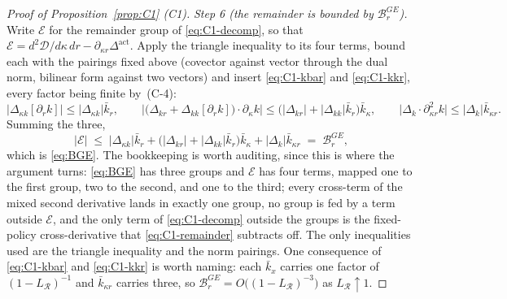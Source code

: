\documentclass[11pt]{article}
\newcommand{\Dact}{\Delta^{\mathrm{act}}}
\begin{document}
\begin{proof}[Proof of Proposition~\ref{prop:C1} (C1)]
\emph{Step 6 (the remainder is bounded by $\mathcal B_r^{GE}$).} Write $\mathcal E$ for the
remainder group of \eqref{eq:C1-decomp}, so that
$\mathcal E = d^2\mathcal D/d\kappa\,dr - \partial_{\kappa r}\Dact$. Apply the triangle inequality
to its four terms, bound each with the pairings fixed above (covector against vector through the
dual norm, bilinear form against two vectors) and insert \eqref{eq:C1-kbar} and
\eqref{eq:C1-kkr}, every factor being finite by~(C-4):
\[
\bigl\lvert\Delta_{\kappa k}[\partial_r k]\bigr\rvert \le \lvert\Delta_{\kappa k}\rvert\bar k_r,
\qquad
\bigl\lvert\bigl(\Delta_{kr}+\Delta_{kk}[\partial_r k]\bigr)\cdot\partial_\kappa k\bigr\rvert
\le \bigl(\lvert\Delta_{kr}\rvert + \lvert\Delta_{kk}\rvert\bar k_r\bigr)\bar k_\kappa,
\qquad
\bigl\lvert\Delta_k\cdot\partial^2_{\kappa r}k\bigr\rvert \le \lvert\Delta_k\rvert\bar k_{\kappa r}.
\]
Summing the three,
\begin{equation}
\label{eq:C1-remainder}
\bigl\lvert \mathcal E \bigr\rvert
\;\le\; \lvert\Delta_{\kappa k}\rvert\bar k_r
+ \bigl(\lvert\Delta_{kr}\rvert + \lvert\Delta_{kk}\rvert\bar k_r\bigr)\bar k_\kappa
+ \lvert\Delta_k\rvert\bar k_{\kappa r}
\;=\; \mathcal B_r^{GE},
\end{equation}
which is \eqref{eq:BGE}. The bookkeeping is worth auditing, since this is where the argument turns:
\eqref{eq:BGE} has three groups and $\mathcal E$ has four terms, mapped one to the first group, two
to the second, and one to the third; every cross-term of the mixed second derivative lands in
exactly one group, no group is fed by a term outside $\mathcal E$, and the only term of
\eqref{eq:C1-decomp} outside the groups is the fixed-policy cross-derivative that
\eqref{eq:C1-remainder} subtracts off. The only inequalities used are the triangle inequality and
the norm pairings. One consequence of \eqref{eq:C1-kbar} and \eqref{eq:C1-kkr} is worth naming: each
$\bar k_x$ carries one factor of $(1-L_{\mathcal R})^{-1}$ and $\bar k_{\kappa r}$ carries three, so
$\mathcal B_r^{GE} = O\bigl((1-L_{\mathcal R})^{-3}\bigr)$ as $L_{\mathcal R}\uparrow1$.


\end{proof}
\end{document}
